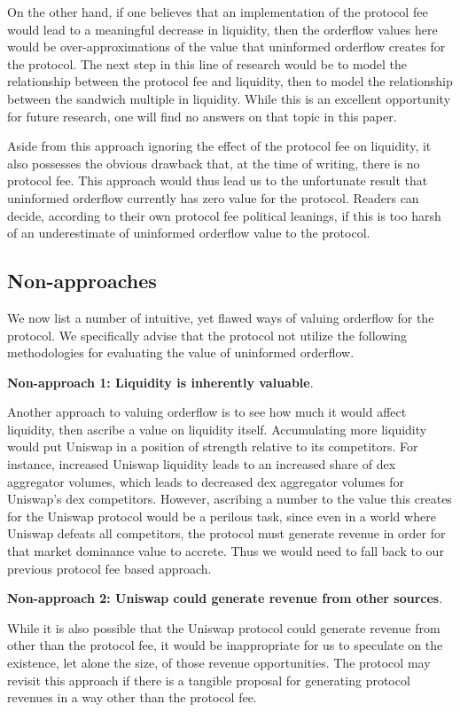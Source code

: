     On the other hand, if one believes that an implementation of the protocol fee would lead to a meaningful decrease in liquidity, then the orderflow values here would be over-approximations of the value that uninformed orderflow creates for the protocol. The next step in this line of research would be to model the relationship between the protocol fee and liquidity, then to model the relationship between the sandwich multiple in liquidity. While this is an excellent opportunity for future research, one will find no answers on that topic in this paper.

    Aside from this approach ignoring the effect of the protocol fee on liquidity, it also possesses the obvious drawback that, at the time of writing, there is no protocol fee. This approach would thus lead us to the unfortunate result that uninformed orderflow currently has zero value for the protocol. Readers can decide, according to their own protocol fee political leanings, if this is too harsh of an underestimate of uninformed orderflow value to the protocol.

\subsection{Non-approaches}
    We now list a number of intuitive, yet flawed ways of valuing orderflow for the protocol. We specifically advise that the protocol not utilize the following methodologies for evaluating the value of uninformed orderflow.

    \textbf{Non-approach 1: Liquidity is inherently valuable}.

    Another approach to valuing orderflow is to see how much it would affect liquidity, then ascribe a value on liquidity itself. Accumulating more liquidity would put Uniswap in a position of strength relative to its competitors. For instance, increased Uniswap liquidity leads to an increased share of dex aggregator volumes, which leads to decreased dex aggregator volumes for Uniswap's dex competitors. However, ascribing a number to the value this creates for the Uniswap protocol would be a perilous task, since even in a world where Uniswap defeats all competitors, the protocol must generate revenue in order for that market dominance value to accrete. Thus we would need to fall back to our previous protocol fee based approach.


    \textbf{Non-approach 2: Uniswap could generate revenue from other sources}.

    While it is also possible that the Uniswap protocol could generate revenue from other than the protocol fee, it would be inappropriate for us to speculate on the existence, let alone the size, of those revenue opportunities. The protocol may revisit this approach if there is a tangible proposal for generating protocol revenues in a way other than the protocol fee.


